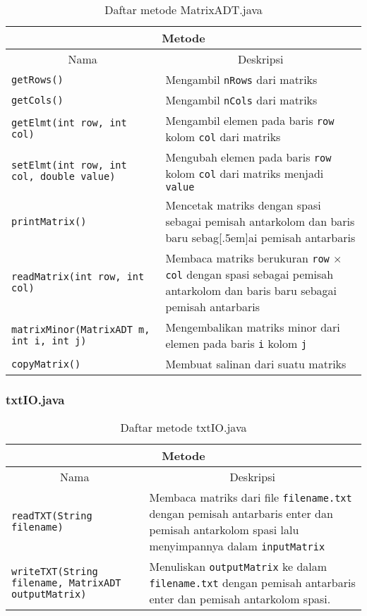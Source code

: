 \begin{table}[H]
    \centering
    \caption{Daftar metode MatrixADT.java}
    \begin{tabular}{p{}|p{}}
        \hline
        \hline
        \multicolumn{2}{c}{\textbf{Metode}}\\
        \hline
        \hline
         \multicolumn{1}{c|}{Nama}  & \multicolumn{1}{c}{Deskripsi} \\
         \hline 
         \hline 
         \verb|getRows()|                                   & Mengambil \verb|nRows| dari matriks \\[.5em]
         \verb|getCols()|                                   & Mengambil \verb|nCols| dari matriks \\[.5em]
         \verb|getElmt(int row, int col)|                   & Mengambil elemen pada baris \verb|row| kolom \verb|col| dari matriks \\[.5em]
         \texttt{setElmt(int row, int col, double value)}   & Mengubah elemen pada baris \verb|row| kolom \verb|col| dari matriks menjadi \verb|value| \\[.5em]
         \verb|printMatrix()|                               & Mencetak matriks dengan spasi sebagai pemisah antarkolom dan baris baru sebag[.5em]ai pemisah antarbaris \\[.5em]
         \texttt{readMatrix(int row, int col)}              & Membaca matriks berukuran \verb|row| $\times$ \verb|col| dengan spasi sebagai pemisah antarkolom dan baris baru sebagai pemisah antarbaris \\[.5em]
         \texttt{matrixMinor(MatrixADT m, int i, int j)}    & Mengembalikan matriks minor dari elemen pada baris \verb|i| kolom \verb|j| \\[.5em]
         \verb|copyMatrix()|                                & Membuat salinan dari suatu matriks   
    \end{tabular}
\end{table}

\subsubsection{txtIO.java}

\begin{table}[H]
    \centering
    \caption{Daftar metode txtIO.java}
    \begin{tabular}{p{}|p{}}
        \hline
        \hline
        \multicolumn{2}{c}{\textbf{Metode}}\\
        \hline
        \hline
         \multicolumn{1}{c|}{Nama}  & \multicolumn{1}{c}{Deskripsi} \\
         \hline 
         \hline 
         \texttt{readTXT(String filename)}&  Membaca matriks dari file \verb|filename.txt| dengan pemisah antarbaris enter dan pemisah antarkolom spasi lalu menyimpannya dalam \verb|inputMatrix|\\[.5em]
         \texttt{writeTXT(String filename, MatrixADT outputMatrix)}&  Menuliskan \verb|outputMatrix| ke dalam \verb|filename.txt| dengan pemisah antarbaris enter dan pemisah antarkolom spasi.
    \end{tabular}
\end{table}

